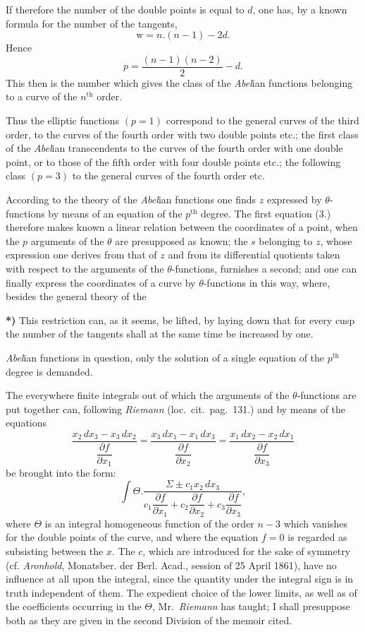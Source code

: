 \documentclass{article}
\begin{document}
If therefore the number of the double points is equal to $d$, one has, by a known formula for the number of the tangents,
\[ \mathrm{w} = n.(n-1) - 2d. \]
Hence
\[ p = \frac{(n-1)(n-2)}{2} - d. \tag{4.} \]
This then is the number which gives the class of the \emph{Abel}ian functions belonging to a curve of the $n^{\text{th}}$ order.

Thus the elliptic functions $(p = 1)$ correspond to the general curves of the third order, to the curves of the fourth order with two double points etc.; the first class of the \emph{Abel}ian transcendents to the curves of the fourth order with one double point, or to those of the fifth order with four double points etc.; the following class $(p = 3)$ to the general curves of the fourth order etc.

According to the theory of the \emph{Abel}ian functions one finds $z$ expressed by $\theta$-functions by means of an equation of the $p^{\text{th}}$ degree. The first equation (3.) therefore makes known a linear relation between the coordinates of a point, when the $p$ arguments of the $\theta$ are presupposed as known; the $s$ belonging to $z$, whose expression one derives from that of $z$ and from its differential quotients taken with respect to the arguments of the $\theta$-functions, furnishes a second; and one can finally express the coordinates of a curve by $\theta$-functions in this way, where, besides the general theory of the

\textbf{*)} This restriction can, as it seems, be lifted, by laying down that for every cusp the number of the tangents shall at the same time be increased by one.

\emph{Abel}ian functions in question, only the solution of a single equation of the $p^{\text{th}}$ degree is demanded.

The everywhere finite integrals out of which the arguments of the $\theta$-functions are put together can, following \emph{Riemann} (loc.\ cit.\ pag.\ 131.) and by means of the equations
\[ \frac{x_{2}\,dx_{3} - x_{3}\,dx_{2}}{\dfrac{\partial f}{\partial x_{1}}} = \frac{x_{3}\,dx_{1} - x_{1}\,dx_{3}}{\dfrac{\partial f}{\partial x_{2}}} = \frac{x_{1}\,dx_{2} - x_{2}\,dx_{1}}{\dfrac{\partial f}{\partial x_{3}}} \]
be brought into the form:
\[ \int \Theta.\frac{\Sigma\pm c_{1}x_{2}\,dx_{3}}{c_{1}\dfrac{\partial f}{\partial x_{1}} + c_{2}\dfrac{\partial f}{\partial x_{2}} + c_{3}\dfrac{\partial f}{\partial x_{3}}}, \]
where $\Theta$ is an integral homogeneous function of the order $n-3$ which vanishes for the double points of the curve, and where the equation $f = 0$ is regarded as subsisting between the $x$. The $c$, which are introduced for the sake of symmetry (cf. \emph{Aronhold}, Monatsber. der Berl. Acad., session of 25 April 1861), have no influence at all upon the integral, since the quantity under the integral sign is in truth independent of them. The expedient choice of the lower limits, as well as of the coefficients occurring in the $\Theta$, Mr.\ \emph{Riemann} has taught; I shall presuppose both as they are given in the second Division of the memoir cited.
\end{document}
